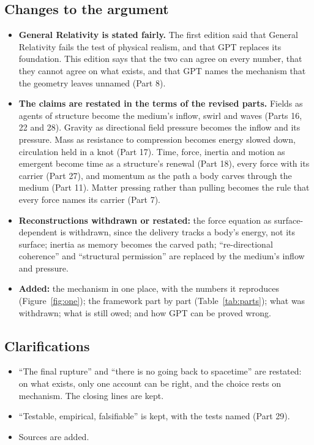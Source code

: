\documentclass[11pt,a4paper]{article}
\begin{document}
\subsection*{Changes to the argument}
\begin{itemize}
\item \textbf{General Relativity is stated fairly.} The first edition said that General Relativity fails the test of physical realism, and that GPT replaces its foundation. This edition says that the two can agree on every number, that they cannot agree on what exists, and that GPT names the mechanism that the geometry leaves unnamed (Part 8).
\item \textbf{The claims are restated in the terms of the revised parts.} Fields as agents of structure become the medium's inflow, swirl and waves (Parts 16, 22 and 28). Gravity as directional field pressure becomes the inflow and its pressure. Mass as resistance to compression becomes energy slowed down, circulation held in a knot (Part 17). Time, force, inertia and motion as emergent become time as a structure's renewal (Part 18), every force with its carrier (Part 27), and momentum as the path a body carves through the medium (Part 11). Matter pressing rather than pulling becomes the rule that every force names its carrier (Part 7).
\item \textbf{Reconstructions withdrawn or restated:} the force equation as surface-dependent is withdrawn, since the delivery tracks a body's energy, not its surface; inertia as memory becomes the carved path; ``re-directional coherence'' and ``structural permission'' are replaced by the medium's inflow and pressure.
\item \textbf{Added:} the mechanism in one place, with the numbers it reproduces (Figure~\ref{fig:one}); the framework part by part (Table~\ref{tab:parts}); what was withdrawn; what is still owed; and how GPT can be proved wrong.
\end{itemize}

\subsection*{Clarifications}
\begin{itemize}
\item ``The final rupture'' and ``there is no going back to spacetime'' are restated: on what exists, only one account can be right, and the choice rests on mechanism. The closing lines are kept.
\item ``Testable, empirical, falsifiable'' is kept, with the tests named (Part 29).
\item Sources are added.
\end{itemize}

\nocite{rashadaPart15}

\end{document}
